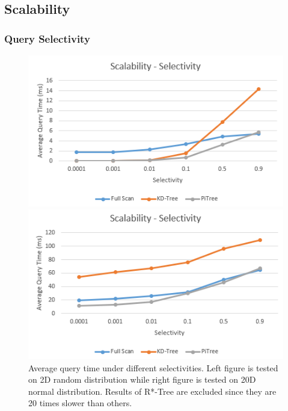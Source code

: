 \documentclass[sigconf,10pt]{acmart}
\begin{document}
\subsection{Scalability}

\subsubsection{Query Selectivity}

\begin{figure}[ht] 
  \label{scalability-selectivity} 
  \begin{minipage}[b]{0.45\linewidth}
    \centering
    \includegraphics[width=.8\linewidth]{../figures/scalability/selectivity-random} 
    \vspace{4ex}
  \end{minipage}%
  \begin{minipage}[b]{0.45\linewidth}
    \centering
    \includegraphics[width=.8\linewidth]{../figures/scalability/selectivity-normal} 
    \vspace{4ex}
  \end{minipage}%
  \caption{Average query time under different selectivities. Left figure is tested
  on 2D random distribution while right figure is tested on 20D normal distribution.
  Results of R*-Tree are excluded since they are 20 times slower than others.}
\end{figure}
\end{document}
